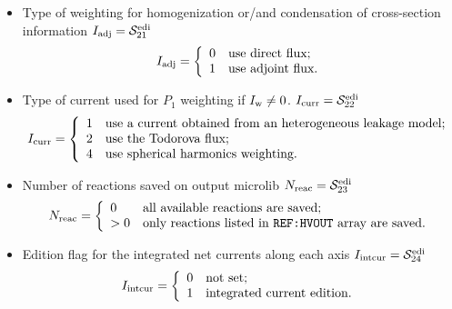 \begin{itemize}
\begin{displaymath}
\begin{array}{ll}
1 & \textrm{the macro-geometry of the last editing is available}\\
\end{array} \right.
\end{displaymath}
\item Type of weighting for homogenization or/and condensation of cross-section information $I_{\rm adj}=\mathcal{S}^{\rm edi}_{21}$
\begin{displaymath}
I_{\rm adj} = \left\{
\begin{array}{ll}
0 & \textrm{use direct flux;} \\
1 & \textrm{use adjoint flux.} \\
\end{array} \right.
\end{displaymath}
\item Type of current used for $P_1$ weighting if $I_{\rm w}\ne 0$. $I_{\rm curr}=\mathcal{S}^{\rm edi}_{22}$
\begin{displaymath}
I_{\rm curr} = \left\{
\begin{array}{ll}
1 & \textrm{use a current obtained from an heterogeneous leakage model;} \\
2 & \textrm{use the Todorova flux;} \\
4 & \textrm{use spherical harmonics weighting.} \\
\end{array} \right.
\end{displaymath}
\item Number of reactions saved on output microlib $N_{\rm reac}=\mathcal{S}^{\rm edi}_{23}$
\begin{displaymath}
N_{\rm reac} = \left\{
\begin{array}{ll}
0 & \textrm{all available reactions are saved;} \\
>0 & \textrm{only reactions listed in {\tt REF:HVOUT} array are saved.} \\
\end{array} \right.
\end{displaymath}
\item Edition flag for the integrated net currents along each axis $I_{\rm intcur}=\mathcal{S}^{\rm edi}_{24}$
\begin{displaymath}
I_{\rm intcur} = \left\{
\begin{array}{ll}
0 & \textrm{not set;} \\
1 & \textrm{integrated current edition.} \\
\end{array} \right.
\end{displaymath}

\end{itemize}
